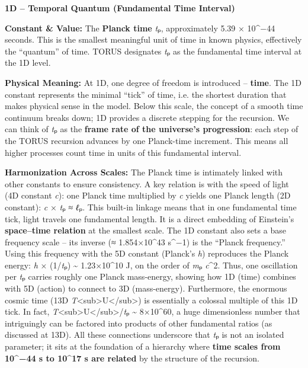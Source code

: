 \documentclass[
]{article}
\begin{document}
\textbf{1D -- Temporal Quantum (Fundamental Time Interval)}

\textbf{Constant \& Value:} The \textbf{Planck time} \emph{t}ₚ,
approximately 5.39 × 10\^{}−44 seconds\hspace{0pt}. This is the smallest
meaningful unit of time in known physics, effectively the ``quantum'' of
time. TORUS designates \emph{t}ₚ as the fundamental time interval at the
1D level.

\textbf{Physical Meaning:} At 1D, one degree of freedom is introduced --
\textbf{time}. The 1D constant represents the minimal ``tick'' of time,
i.e. the shortest duration that makes physical sense in the
model\hspace{0pt}. Below this scale, the concept of a smooth time
continuum breaks down; 1D provides a discrete stepping for the
recursion. We can think of \emph{t}ₚ as the \textbf{frame rate of the
universe's progression}\hspace{0pt}: each step of the TORUS recursion
advances by one Planck-time increment. This means all higher processes
count time in units of this fundamental interval.

\textbf{Harmonization Across Scales:} The Planck time is intimately
linked with other constants to ensure consistency. A key relation is
with the speed of light (4D constant \emph{c}): one Planck time
multiplied by \emph{c} yields one Planck length (2D constant): \emph{c}
× \emph{t}ₚ ≈ \emph{ℓ}ₚ\hspace{0pt}. This built-in linkage means that in
one fundamental time tick, light travels one fundamental length. It is a
direct embedding of Einstein's \textbf{space--time relation} at the
smallest scale. The 1D constant also sets a base frequency scale -- its
inverse (≈ 1.854×10\^{}43 s\^{}−1) is the ``Planck frequency.'' Using
this frequency with the 5D constant (Planck's \emph{h}) reproduces the
Planck energy: \emph{h} × (1/\emph{t}ₚ) \textasciitilde{} 1.23×10\^{}10
J, on the order of \emph{m}ₚ \emph{c}\^{}2\hspace{0pt}. Thus, one
oscillation per \emph{t}ₚ carries roughly one Planck mass-energy,
showing how 1D (time) combines with 5D (action) to connect to 3D
(mass-energy). Furthermore, the enormous cosmic time (13D
\emph{T}\textless sub\textgreater U\textless/sub\textgreater) is
essentially a colossal multiple of this 1D tick. In fact,
\emph{T}\textless sub\textgreater U\textless/sub\textgreater/\emph{t}ₚ
\textasciitilde{} 8×10\^{}60, a huge dimensionless number that
intriguingly can be factored into products of other fundamental ratios
(as discussed at 13D)\hspace{0pt}. All these connections underscore that
\emph{t}ₚ is not an isolated parameter; it sits at the foundation of a
hierarchy where \textbf{time scales from 10\^{}−44 s to 10\^{}17 s are
related} by the structure of the recursion.
\end{document}
